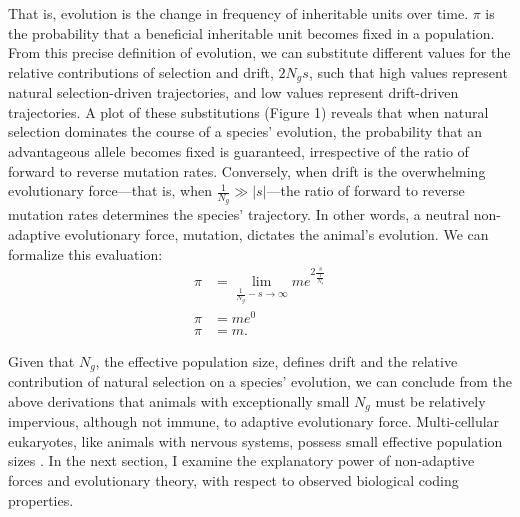 \documentclass{article}
\begin{document}
That is, evolution is the change in frequency of inheritable units over time. $\pi$ is the probability that a beneficial inheritable unit becomes fixed in a population. From this precise definition of evolution, we can substitute different values for the relative contributions of selection and drift, $2N_g s$, such that high values represent natural selection-driven trajectories, and low values represent drift-driven trajectories. A plot of these substitutions (Figure 1) reveals that when natural selection dominates the course of a species' evolution, the probability that an advantageous allele becomes fixed is guaranteed, irrespective of the ratio of forward to reverse mutation rates. Conversely, when drift is the overwhelming evolutionary force---that is, when $\frac{1}{N_g} \gg |s|$---the ratio of forward to reverse mutation rates determines the species' trajectory. In other words, a neutral non-adaptive evolutionary force, mutation, dictates the animal's evolution. We can formalize this evaluation:
\begingroup
\large
\begin{equation}
\begin{split}
    \pi & = \lim_{\frac{1}{N_g} - s \to \infty} m e^{2 \frac{s}{\frac{1}{N_g}}} \\
    \pi &= m e^0 \\
    \pi & = m.
\end{split}
\end{equation}
\endgroup

Given that $N_g$, the effective population size, defines drift and the relative contribution of natural selection on a species' evolution, we can conclude from the above derivations that animals with exceptionally small $N_g$ must be relatively impervious, although not immune, to adaptive evolutionary force. Multi-cellular eukaryotes, like animals with nervous systems, possess small effective population sizes \cite{Lynch_Conery_2003}. In the next section, I examine the explanatory power of non-adaptive forces and evolutionary theory, with respect to observed biological coding properties. 
\end{document}
